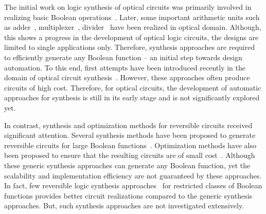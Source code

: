 \documentclass[10pt,letterpaper,twoside,openright]{book}
\begin{document}
The initial work on logic synthesis of optical circuits was primarily involved in realizing basic Boolean operations~\cite{Kim:06,Martinez2007,Taraphdar2010}. Later, some important arithmetic units such as adder~\cite{DattaCS15}, multiplexer~\cite{Datta2014}, divider~\cite{Aikawa2011} have been realized in optical domain. Although, this shows a progress in the development of optical logic circuits, the designs are limited to single applications only. Therefore, synthesis approaches are required to efficiently generate any Boolean function -- an initial step towards design automation. 
To this end, first attempts have been introduced recently in the domain of optical circuit synthesis~\cite{Condrat2011,WKHD:2015}. However, these approaches often produce circuits of high cost. Therefore, for optical circuits, the development of automatic approaches for synthesis is still in its early stage and is not significantly explored yet.

In contrast, synthesis and optimization methods for reversible circuits received significant attention. Several synthesis methods have been proposed to generate reversible circuits for large Boolean functions~\cite{jetc/DattaRSR14,integration/WilleSSD16,entcs/WilleD10,dac/WilleSD10,tcad/GrosseWDD09,
ismvl/GrosseWDD08,tcos/DattaSRD14,Saeedi:2010,miller2003transformation,gupta2006algorithm}. Optimization methods have also been proposed to ensure that the resulting circuits are of small cost~\cite{ismvl/DebWDD15,aspdac/WilleSOD13,mvl/MillerWD12}. Although these generic synthesis approaches can generate any Boolean function, yet the scalability and implementation efficiency are not guaranteed by these approaches. In fact, few reversible logic synthesis approaches~\cite{Maslov:2006,perkowski2001regular} for restricted classes of Boolean functions provides better circuit realizations compared to the generic synthesis approaches. But, such synthesis approaches are not investigated extensively.
\end{document}
